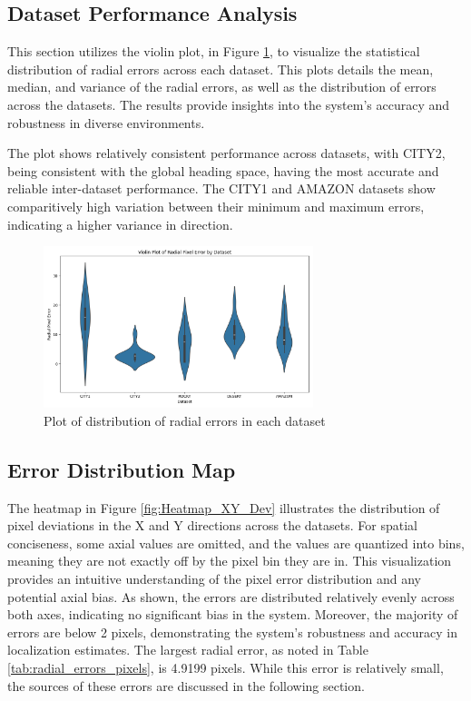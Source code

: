 \subsection{Dataset Performance Analysis}

This section utilizes the violin plot, in Figure \ref{fig:Violin Dataset Plot}, to visualize the statistical distribution of radial errors across each dataset. This plots details the mean, median, and variance of the radial errors, as well as the distribution of errors across the datasets. The results provide insights into the system's accuracy and robustness in diverse environments. 

The plot shows relatively consistent performance across datasets, with CITY2, being consistent with the global heading space, having the most accurate and reliable inter-dataset performance. The CITY1 and AMAZON datasets show comparitively high variation between their minimum and maximum errors, indicating a higher variance in direction.

\begin{figure}[H]
    \centering
    \includegraphics[width=0.7\textwidth]{Chapter 5/RESULTPLOTS/violindatasets.png}
    \caption{Plot of distribution of radial errors in each dataset}
    \label{fig:Violin Dataset Plot}
\end{figure}



\subsection{Error Distribution Map}

The heatmap in Figure \ref{fig:Heatmap_XY_Dev} illustrates the distribution of pixel deviations in the X and Y directions across the datasets. For spatial conciseness, some axial values are omitted, and the values are quantized into bins, meaning they are not exactly off by the pixel bin they are in. This visualization provides an intuitive understanding of the pixel error distribution and any potential axial bias. As shown, the errors are distributed relatively evenly across both axes, indicating no significant bias in the system. Moreover, the majority of errors are below 2 pixels, demonstrating the system's robustness and accuracy in localization estimates. The largest radial error, as noted in Table \ref{tab:radial_errors_pixels}, is 4.9199 pixels. While this error is relatively small, the sources of these errors are discussed in the following section.


